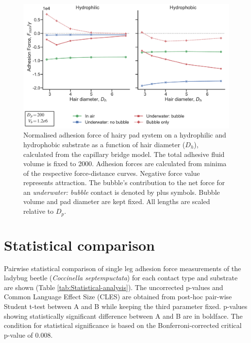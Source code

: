 \documentclass[english]{achemso}
\begin{document}
\begin{figure}[H]
\includegraphics{FigureS3-Effect_of_hair_size(constant_vol)}

\caption{Normalised adhesion force of hairy pad system on a hydrophilic and
hydrophobic substrate as a function of hair diameter ($D_{h}$), calculated
from the capillary bridge model. The total adhesive fluid volume is
fixed to 2000. Adhesion forces are calculated from minima of the respective
force-distance curves. Negative force value represents attraction.
The bubble's contribution to the net force for an \emph{underwater:
bubble} contact is denoted by plus symbols. Bubble volume and pad
diameter are kept fixed. All lengths are scaled relative to $D_{p}$.}
\end{figure}


\section{Statistical comparison}

Pairwise statistical comparison of single leg adhesion force measurements
of the ladybug beetle (\emph{Coccinella septempuctata}) for each contact
type and substrate are shown (Table \ref{tab:Statistical-analysis}).
The uncorrected p-values and Common Language Effect Size (CLES) are
obtained from post-hoc pair-wise Student t-test between A and B while
keeping the third parameter fixed. p-values showing statistically
significant difference between A and B are in boldface. The condition
for statistical significance is based on the Bonferroni-corrected
critical p-value of 0.008.
\end{document}
